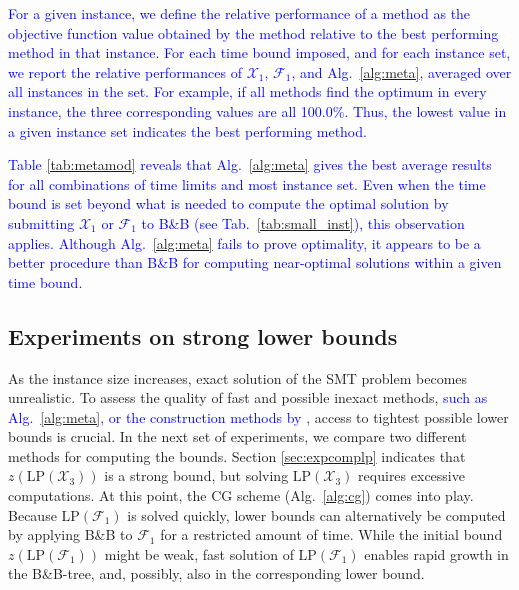 \textcolor{blue}{
For a given instance, we define the relative performance of a method as the objective function value obtained by the method relative to the best performing method in that instance.
For each time bound imposed, and for each instance set,
we report the relative performances of $\mathcal{X}_1$, $\mathcal{F}_1$, and Alg.\ \ref{alg:meta}, averaged over all instances in the set.
For example, if all methods find the optimum in every instance, the three corresponding values are all 100.0\%.
Thus, the lowest value in a given instance set indicates the best performing method.
}

\textcolor{blue}{
Table \ref{tab:metamod} reveals that Alg.\ \ref{alg:meta} gives the best average results for all combinations of time limits and most instance set.
Even when the time bound is set beyond what is needed to compute the optimal solution by submitting $\mathcal{X}_1$ or $\mathcal{F}_1$ to B\&B (see Tab.\ \ref{tab:small_inst}),
this observation applies.
Although Alg.\ \ref{alg:meta} fails to prove optimality, it appears to be a better procedure than B\&B for computing near-optimal solutions within a given time bound.
}
\newline

\subsection{Experiments on strong lower bounds}

As the instance size increases, exact solution of the SMT problem becomes unrealistic.
To assess the quality of fast and possible inexact methods, \textcolor{blue}{such as Alg.\ \ref{alg:meta}, 
or the construction methods by \citep{ivanova16isco}},  access to tightest possible lower bounds is crucial.
In the next set of experiments, we compare two different methods for computing the bounds.
Section \ref{sec:expcomplp} indicates that $z\left(\text{LP}(\mathcal{X}_3)\right)$ is a strong bound,
but solving $\text{LP}(\mathcal{X}_3)$ requires excessive computations.
At this point, the CG scheme (Alg.\ \ref{alg:cg}) comes into play.
Because $\text{LP}(\mathcal{F}_1)$ is solved quickly, lower bounds can alternatively be computed 
by applying B\&B to $\mathcal{F}_1$ for a restricted amount of time.
While the initial bound $z\left(\text{LP}(\mathcal{F}_1)\right)$ might be weak, fast solution of $\text{LP}(\mathcal{F}_1)$ enables rapid growth in the B\&B-tree,
and, possibly, also in the corresponding lower bound.


